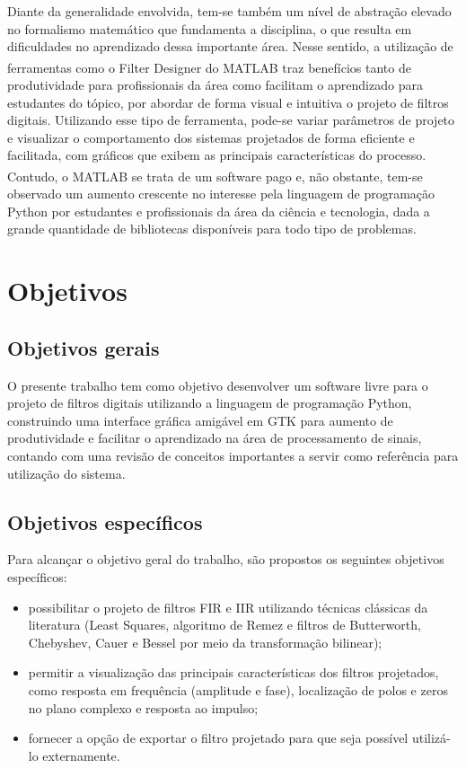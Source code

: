 \documentclass[12pt,a4paper]{report}
\begin{document}
  Diante da generalidade envolvida, tem-se também um nível de abstração elevado no formalismo matemático que
  fundamenta a disciplina, o que resulta em dificuldades no aprendizado dessa importante área. Nesse sentido,
  a utilização de ferramentas como o Filter Designer do MATLAB\textsuperscript{\textregistered} traz benefícios
  tanto de produtividade para profissionais da área como facilitam o aprendizado para estudantes do tópico, por
  abordar de forma visual e intuitiva o projeto de filtros digitais. Utilizando esse tipo de ferramenta, pode-se
  variar parâmetros de projeto e visualizar o comportamento dos sistemas projetados de forma eficiente e
  facilitada, com gráficos que exibem as principais características do processo. Contudo, o
  MATLAB\textsuperscript{\textregistered} se trata de um software pago e, não obstante, tem-se observado um
  aumento crescente no interesse pela linguagem de programação Python por estudantes e profissionais da área
  da ciência e tecnologia, dada a grande quantidade de bibliotecas disponíveis para todo tipo de problemas.

\chapter{Objetivos}
\section{Objetivos gerais}
  O presente trabalho tem como objetivo desenvolver um software livre para o projeto de filtros digitais
  utilizando a linguagem de programação Python, construindo uma interface gráfica amigável em GTK para aumento
  de produtividade e facilitar o aprendizado na área de processamento de sinais, contando com uma revisão de
  conceitos importantes a servir como referência para utilização do sistema.

\section{Objetivos específicos}
  Para alcançar o objetivo geral do trabalho, são propostos os seguintes objetivos específicos:
  \begin{itemize}
    \item possibilitar o projeto de filtros FIR e IIR utilizando técnicas clássicas da literatura (Least Squares,
      algoritmo de Remez e filtros de Butterworth, Chebyshev, Cauer e Bessel por meio da transformação bilinear);
    \item permitir a visualização das principais características dos filtros projetados, como resposta em
      frequência (amplitude e fase), localização de polos e zeros no plano complexo e resposta ao impulso;
    \item fornecer a opção de exportar o filtro projetado para que seja possível utilizá-lo externamente.
  \end{itemize}
\end{document}
